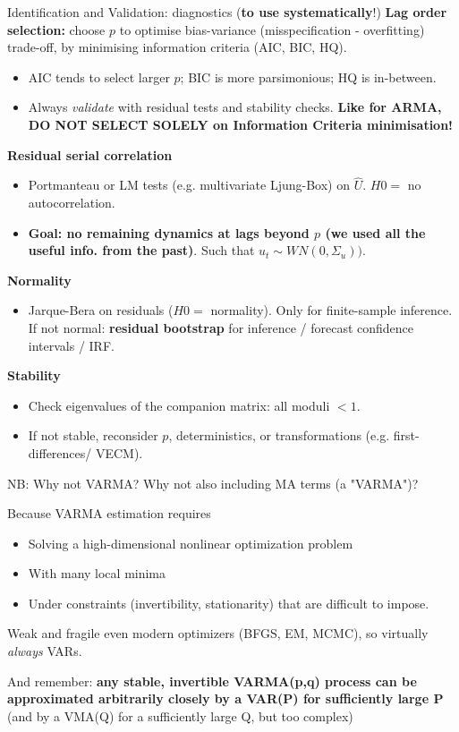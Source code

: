 \documentclass{beamer}
\begin{document}
\begin{frame}{Identification and Validation: diagnostics (\textbf{to use systematically}!)}
\footnotesize
\textbf{Lag order selection:} choose $p$ to optimise bias-variance (misspecification - overfitting) trade-off, by minimising information criteria (AIC, BIC, HQ).
\begin{itemize}
  \item AIC tends to select larger $p$; BIC is more parsimonious; HQ is in-between.
  \item Always \emph{validate} with residual tests and stability checks. \textbf{Like for ARMA, DO NOT SELECT SOLELY on Information Criteria minimisation!}
\end{itemize}

\textbf{Residual serial correlation}
\begin{itemize}
  \item Portmanteau or LM tests (e.g. multivariate Ljung-Box) on $\widehat{U}$. $H0=$ no autocorrelation.
  \item \textbf{Goal: no remaining dynamics at lags beyond $p$ (we used all the useful info. from the past)}. Such that $u_t \sim WN (0, \Sigma_u))$.
\end{itemize}


\textbf{Normality}
\begin{itemize}
  \item Jarque-Bera on residuals ($H0=$ normality). Only for finite-sample inference. If not normal: \textbf{residual bootstrap} for inference / forecast confidence intervals / IRF.
\end{itemize}

\textbf{Stability}
\begin{itemize}
  \item Check eigenvalues of the companion matrix: all moduli $<1$.
  \item If not stable, reconsider $p$, deterministics, or transformations (e.g. first-differences/  VECM).
\end{itemize}
\end{frame}


\begin{frame}{NB: Why not VARMA?}
Why not also including MA terms (a "VARMA")? 
\bigskip

Because VARMA estimation requires
\begin{itemize}
    \item Solving a high-dimensional nonlinear optimization problem
    \item With many local minima
    \item Under constraints (invertibility, stationarity) that are difficult to impose.
\end{itemize}

Weak and fragile even modern optimizers (BFGS, EM, MCMC), so virtually \textit{always} VARs.
\bigskip

And remember: \textbf{any stable, invertible VARMA(p,q) process can be approximated arbitrarily closely by a VAR(P) for sufficiently large P} (and by a VMA(Q) for a sufficiently large Q, but too complex)
    
\end{frame}
\end{document}
